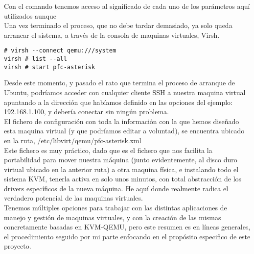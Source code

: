 Con el comando  tenemos acceso  al significado de cada uno de los parámetros aquí utilizados aunque \\

Una vez terminado el proceso, que no debe tardar demasiado, ya solo queda arrancar el sistema, a través de la consola de maquinas virtuales, Virsh.\\

\begin{lstlisting}[style=consola]
# virsh --connect qemu:///system
virsh # list --all
virsh # start pfc-asterisk
\end{lstlisting}

Desde este momento, y pasado el rato que termina el proceso de arranque de Ubuntu, podríamos acceder con cualquier cliente SSH a nuestra maquina virtual apuntando a la dirección que habíamos definido en las opciones del ejemplo: 192.168.1.100, y debería conectar sin ningún problema. \\

El fichero de configuración con toda la información con la que hemos diseñado esta maquina virtual (y que podríamos editar a voluntad), se encuentra ubicado en la ruta, /etc/libvirt/qemu/pfc-asterisk.xml\\

Este fichero es muy práctico, dado que es el fichero que nos facilita la portabilidad para mover nuestra máquina (junto evidentemente, al disco duro virtual ubicado en la anterior ruta) a otra maquina física, e instalando todo el sistema KVM, tenerla activa en solo unos minutos, con total abstracción de los drivers específicos de la nueva máquina. He aquí donde realmente radica el verdadero potencial de las maquinas virtuales.\\

Tenemos múltiples opciones para trabajar con las distintas aplicaciones de manejo y gestión de maquinas virtuales, y con la creación de las mismas concretamente basadas en KVM-QEMU, pero este resumen es en líneas generales, el procedimiento seguido por mi parte enfocando en el propósito especifico de este proyecto.

